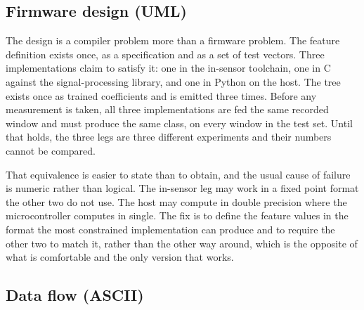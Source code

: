 \subsection*{Firmware design (UML)}


The design is a compiler problem more than a firmware problem. The feature
definition exists once, as a specification and as a set of test vectors. Three
implementations claim to satisfy it: one in the in-sensor toolchain, one in C
against the signal-processing library, and one in Python on the host. The tree
exists once as trained coefficients and is emitted three times. Before any
measurement is taken, all three implementations are fed the same recorded window
and must produce the same class, on every window in the test set. Until that
holds, the three legs are three different experiments and their numbers cannot
be compared.

That equivalence is easier to state than to obtain, and the usual cause of
failure is numeric rather than logical. The in-sensor leg may work in a fixed
point format the other two do not use. The host may compute in double precision
where the microcontroller computes in single. The fix is to define the feature
values in the format the most constrained implementation can produce and to
require the other two to match it, rather than the other way around, which is
the opposite of what is comfortable and the only version that works.

\subsection*{Data flow (ASCII)}

